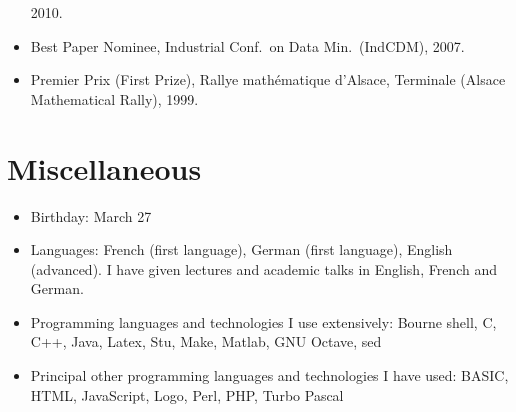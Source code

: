 \documentclass[line,mm]{res}
\newcounter{x}
\newcounter{y}
\begin{document}
\begin{resume}
\begin{itemize}
    2010.  
  \item 
    Best Paper Nominee, Industrial Conf.\ on Data Min.\ (IndCDM), 2007.    
  \item 
    Premier Prix (First Prize), Rallye mathématique d'Alsace, Terminale (Alsace Mathematical Rally), 1999. 
\end{itemize}

\section{Miscellaneous}
\begin{itemize}
  \item Birthday:  March 27
  \item Languages: French (first language), German (first language),
    English (advanced).  I have given lectures and academic talks in English, French and German. 
  \item Programming languages and technologies I use extensively:
    Bourne shell, C, C++, Java, Latex, Stu, Make, Matlab, GNU Octave, sed
  \item Principal other programming languages and technologies I have used:
    BASIC, HTML, JavaScript, Logo, Perl, PHP, Turbo Pascal 
\end{itemize}

\end{resume}
\end{document}
